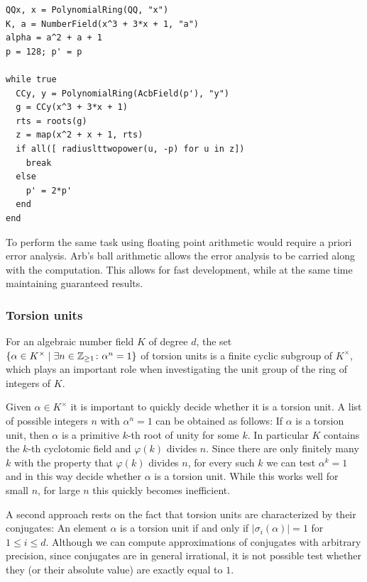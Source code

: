 \documentclass{sig-alternate-05-2015}
\begin{document}
\begin{small}
\begin{verbatim}
QQx, x = PolynomialRing(QQ, "x")
K, a = NumberField(x^3 + 3*x + 1, "a")
alpha = a^2 + a + 1
p = 128; p' = p

while true
  CCy, y = PolynomialRing(AcbField(p'), "y")
  g = CCy(x^3 + 3*x + 1)
  rts = roots(g)
  z = map(x^2 + x + 1, rts)
  if all([ radiuslttwopower(u, -p) for u in z])
    break
  else
    p' = 2*p'
  end
end
\end{verbatim}
\end{small}

To perform the same task using floating point arithmetic would require a priori error analysis.
Arb's ball arithmetic allows the error analysis to be carried along with the computation. This allows for fast development,
while at the same time maintaining guaranteed results.

\subsubsection{Torsion units}

For an algebraic number field $K$ of degree $d$, the set $\{ \alpha \in K^\times \mid \exists n \in \mathbb{Z}_{\geq 1} \colon \alpha^n = 1 \}$ of
torsion units is a finite cyclic subgroup of $K^\times$, which plays an important role
when investigating the unit group of the ring of integers of $K$.

Given $\alpha \in K^\times$ it is important to quickly decide whether it is a torsion unit.
A list of possible integers $n$ with $\alpha^n = 1$ can be obtained as follows:
If $\alpha$ is a torsion unit, then $\alpha$ is a primitive $k$-th root of unity for some $k$.
In particular $K$ contains the $k$-th cyclotomic field and $\varphi(k)$ divides $n$.
Since there are only finitely many $k$ with the property that $\varphi(k)$ divides $n$,
for every such $k$ we can test $\alpha^k = 1$ and in this way decide whether $\alpha$ is a torsion unit.
While this works well for small $n$, for large $n$ this quickly becomes inefficient.

A second approach rests on the fact that torsion units are characterized by their conjugates: An element
$\alpha$ is a torsion unit if and only if $\lvert \sigma_i(\alpha) \rvert = 1$ for $1 \leq i \leq d$.
Although we can compute approximations of conjugates with arbitrary precision, since conjugates are in general
irrational, it is not possible test whether they (or their absolute value) are exactly equal to $1$.
\end{document}
